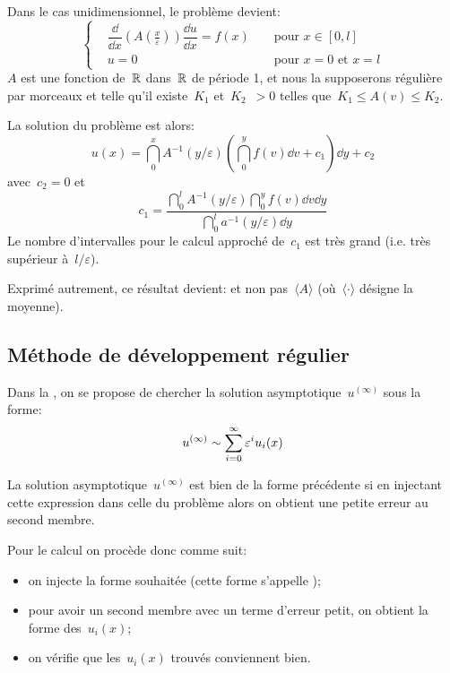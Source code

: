 \medskip
Dans le cas unidimensionnel, le problème devient:
\begin{equation}
\left\{
\begin{aligned}
&\dfrac \dd{\dd x}\left(A\left(\frac x\varepsilon\right)\right) \dfrac{\dd u}{\dd x} = f(x)&& \text{ pour } x\in[0,l]\\
&u=0 &&\text{ pour } x=0 \text{ et } x=l
\end{aligned}
\right.
\end{equation}
$A$ est une fonction de~$\mathbb R$ dans~$\mathbb R$ de période 1, et nous la supposerons régulière par morceaux et telle qu'il existe~$K_1$ et~$K_2$~$>0$ telles que~$K_1\le A(v)\le K_2$.

\medskip
La solution du problème est alors:
\begin{equation}
u(x)=\dint_0^x A^{-1}(y/\varepsilon) \left(\dint_0^y f(v)\dd v + c_1 \right) \dd y + c_2
\end{equation}
avec~$c_2=0$ et
\begin{equation} c_1 = \dfrac{\dint_0^l A^{-1}(y/\varepsilon)\dint_0^y f(v)\dd v \dd y}{\dint_0^l a^{-1}(y/\varepsilon)\dd y} \end{equation}
Le nombre d'intervalles pour le calcul approché de~$c_1$ est très grand (i.e. très supérieur à~$l/\varepsilon$).

Exprimé autrement, ce résultat devient:  et non pas~$\langle A\rangle$ (où~$\langle\cdot\rangle$ désigne la moyenne).


\medskip
\subsection{Méthode de développement régulier}

Dans la , on se propose de chercher la solution asymptotique~$u^{(\infty)}$ sous la forme:
\begin{equation}
u^{(\infty)} \sim \displaystyle\sum_{i=0}^\infty \varepsilon^iu_i(x)
\end{equation}

\medskip
La solution asymptotique~$u^{(\infty)}$ est bien de la forme précédente si en injectant cette expression dans celle du problème alors on obtient une petite erreur au second membre.

\medskip
Pour le calcul on procède donc comme suit:
\begin{itemize}
  \item on injecte la forme souhaitée (cette forme s'appelle );
  \item pour avoir un second membre avec un terme d'erreur petit, on obtient la forme des~$u_i(x)$;
  \item on vérifie que les~$u_i(x)$ trouvés conviennent bien.
\end{itemize}


